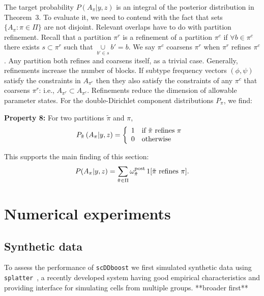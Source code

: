 \documentclass[aoas,preprint]{imsart}
\begin{document}
The target probability $P(A_\pi|y,z)$ is an integral of the posterior distribution in Theorem~3.
To evaluate it, we need to contend with the fact that sets $\{ A_\pi: \pi \in \Pi \}$ are not disjoint.
Relevant overlaps have to do with partition refinement.  Recall 
that a  partition $\pi^r$ is a refinement of a partition $\pi^c$ if $\forall b \in \pi^c$ there 
exists $s \subset \pi^r$  such that $\underset{b'\in s}\cup b' = b$. 
We say $\pi^c$  coarsens $\pi^r$ when $\pi^r$ refines $\pi^c$. Any partition both
refines and coarsens itself, as a trivial case. 
Generally, refinements increase the number of blocks.
 If subtype frequency vectors $(\phi,\psi)$
satisfy the constraints in $A_{\pi^r}$ then they also satisfy the constraints of any $\pi^c$
that coarsens $\pi^r$: i.e., $A_{\pi^r} \subset A_{\pi^c}$.  
Refinements reduce the dimension of allowable parameter states. 
 For the double-Dirichlet
component distributions $P_\pi$, we find:

\noindent
{\bf Property 8:} For two partitions $\tilde \pi$ and $\pi$,  
\begin{eqnarray*}
P_{\tilde \pi}\left( A_{\pi} | y,z \right) = \left\{  \begin{array}{ll}
     1  & {\mbox {\rm if $\tilde \pi$ refines $\pi$ }} \\ 
     0  & {\mbox {\rm otherwise }} \\ 
                                                   \end{array}
   \right.
\end{eqnarray*}


This supports the main finding of this section:
\begin{eqnarray}
P(A_\pi|y,z) = 
\sum_{\tilde \pi \in \Pi} \omega^{\rm post}_{\tilde \pi} \,  1[ {\mbox {\rm $\tilde \pi$ refines $\pi$}} ].
\end{eqnarray}



 
\section{Numerical experiments}

\subsection{Synthetic data} 

To assess the performance of \verb+scDDboost+ we first  simulated
synthetic data using \verb+splatter+~\citep{ref:Zappia}, 
a recently developed system having good empirical characteristics 
and providing interface for simulating cells from multiple groups. **broader first**
\end{document}
